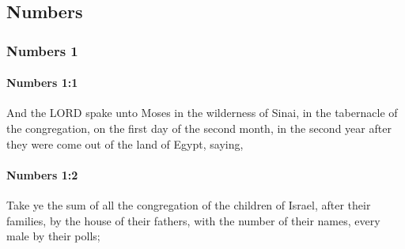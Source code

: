 \subsection{Numbers}
	\label{NUMBERS}

	\subsubsection{Numbers 1} %
		\label{NUMBERS-1}

		\paragraph{Numbers 1:1} %
			\label{NUMBERS-1-1}

			And the LORD spake unto Moses in the wilderness of Sinai, in the tabernacle of the congregation, on the first day of the second month, in the second year after they were come out of the land of Egypt, saying,


		\paragraph{Numbers 1:2} %
			\label{NUMBERS-1-2}

			Take ye the sum of all the congregation of the children of Israel, after their families, by the house of their fathers, with the number of their names, every male by their polls;

